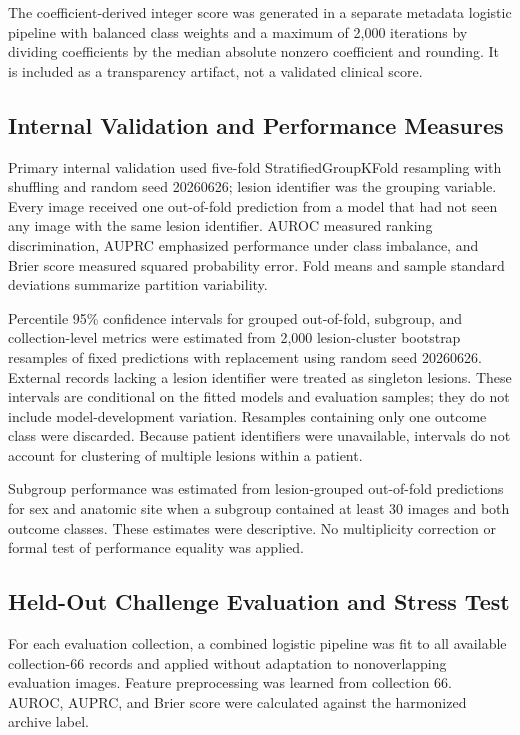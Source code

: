 \documentclass[11pt]{article}
\begin{document}
The coefficient-derived integer score was generated in a separate metadata logistic pipeline with balanced class weights and a maximum of 2,000 iterations by dividing coefficients by the median absolute nonzero coefficient and rounding. It is included as a transparency artifact, not a validated clinical score.

\subsection{Internal Validation and Performance Measures}
Primary internal validation used five-fold StratifiedGroupKFold resampling with shuffling and random seed 20260626; lesion identifier was the grouping variable. Every image received one out-of-fold prediction from a model that had not seen any image with the same lesion identifier. AUROC measured ranking discrimination, AUPRC emphasized performance under class imbalance, and Brier score measured squared probability error. Fold means and sample standard deviations summarize partition variability.

Percentile 95\% confidence intervals for grouped out-of-fold, subgroup, and collection-level metrics were estimated from 2,000 lesion-cluster bootstrap resamples of fixed predictions with replacement using random seed 20260626. External records lacking a lesion identifier were treated as singleton lesions. These intervals are conditional on the fitted models and evaluation samples; they do not include model-development variation. Resamples containing only one outcome class were discarded. Because patient identifiers were unavailable, intervals do not account for clustering of multiple lesions within a patient.

Subgroup performance was estimated from lesion-grouped out-of-fold predictions for sex and anatomic site when a subgroup contained at least 30 images and both outcome classes. These estimates were descriptive. No multiplicity correction or formal test of performance equality was applied.

\subsection{Held-Out Challenge Evaluation and Stress Test}
For each evaluation collection, a combined logistic pipeline was fit to all available collection-66 records and applied without adaptation to nonoverlapping evaluation images. Feature preprocessing was learned from collection 66. AUROC, AUPRC, and Brier score were calculated against the harmonized archive label.
\end{document}

